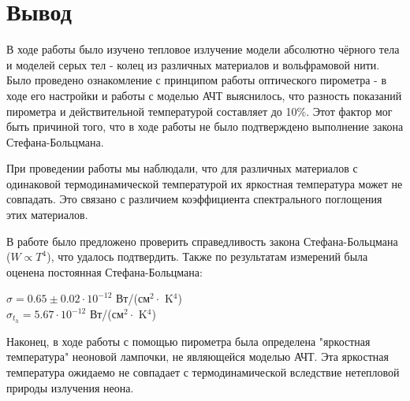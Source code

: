 \documentclass[a4paper, 12pt]{article}
\begin{document}
\section*{Вывод}
В ходе работы было изучено тепловое излучение модели абсолютно чёрного тела и моделей серых тел - колец из различных материалов и вольфрамовой нити. Было проведено ознакомление с принципом работы оптического пирометра - в ходе его настройки и работы с моделью АЧТ выяснилось, что разность показаний пирометра и действительной температурой составляет до 10\%. Этот фактор мог быть причиной того, что в ходе работы не было подтверждено выполнение закона Стефана-Больцмана. \par
При проведении работы мы наблюдали, что для различных материалов с одинаковой термодинамической температурой их яркостная температура может не совпадать. Это связано с различием коэффициента спектрального поглощения этих материалов. \par
В работе было предложено проверить справедливость закона Стефана-Больцмана ($W \propto T^4$), что удалось подтвердить.
Также по результатам измерений была оценена постоянная Стефана-Больцмана:
\begin{center}
    $\sigma = 0.65\pm0.02\cdot 10^{-12}$ Вт/(см$^2 \cdot$ K$^4$) \\
     $\sigma_t_h = 5.67\cdot 10^{-12}$ Вт/(см$^2 \cdot$ K$^4$)
\end{center}
Наконец, в ходе работы с помощью пирометра была определена "яркостная температура" неоновой лампочки, не являющейся моделью АЧТ. Эта яркостная температура ожидаемо не совпадает с термодинамической вследствие нетепловой природы излучения неона.
\end{document}
